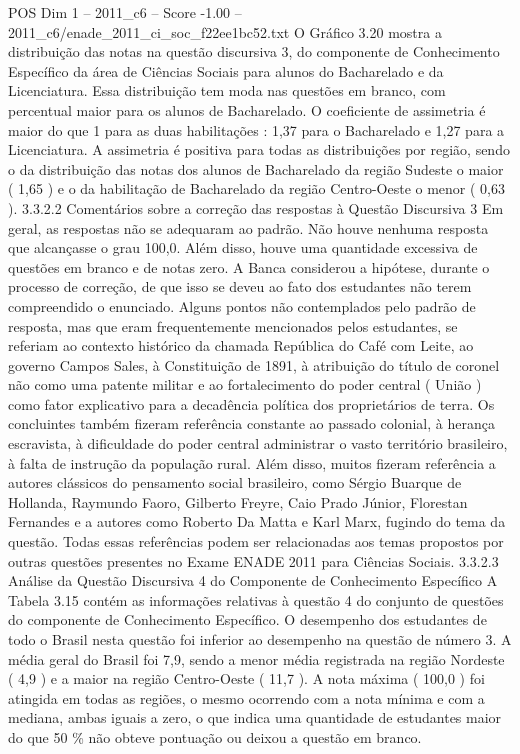 \begin{textsample}{POS Dim 1 – 2011\_c6 – Score -1.00 – 2011\_c6/enade\_2011\_ci\_soc\_f22ee1bc52.txt}
O Gráfico 3.20 mostra a distribuição das notas na questão discursiva 3, do componente de Conhecimento Específico da área de Ciências Sociais para alunos do Bacharelado e da Licenciatura.
Essa distribuição tem moda nas questões em branco, com percentual maior para os alunos de Bacharelado.
O coeficiente de assimetria é maior do que 1 para as duas habilitações : 1,37 para o Bacharelado e 1,27 para a Licenciatura.
A assimetria é positiva para todas as distribuições por região, sendo o da distribuição das notas dos alunos de Bacharelado da região Sudeste o maior ( 1,65 ) e o da habilitação de Bacharelado da região Centro-Oeste o menor ( 0,63 ). 3.3.2.2 Comentários sobre a correção das respostas à Questão Discursiva 3 Em geral, as respostas não se adequaram ao padrão.
Não houve nenhuma resposta que alcançasse o grau 100,0.
Além disso, houve uma quantidade excessiva de questões em branco e de notas zero.
A Banca considerou a hipótese, durante o processo de correção, de que isso se deveu ao fato dos estudantes não terem compreendido o enunciado.
Alguns pontos não contemplados pelo padrão de resposta, mas que eram frequentemente mencionados pelos estudantes, se referiam ao contexto histórico da chamada República do Café com Leite, ao governo Campos Sales, à Constituição de 1891, à atribuição do título de coronel não como uma patente militar e ao fortalecimento do poder central ( União ) como fator explicativo para a decadência política dos proprietários de terra.
Os concluintes também fizeram referência constante ao passado colonial, à herança escravista, à dificuldade do poder central administrar o vasto território brasileiro, à falta de instrução da população rural.
Além disso, muitos fizeram referência a autores clássicos do pensamento social brasileiro, como Sérgio Buarque de Hollanda, Raymundo Faoro, Gilberto Freyre, Caio Prado Júnior, Florestan Fernandes e a autores como Roberto Da Matta e Karl Marx, fugindo do tema da questão.
Todas essas referências podem ser relacionadas aos temas propostos por outras questões presentes no Exame ENADE 2011 para Ciências Sociais. 3.3.2.3 Análise da Questão Discursiva 4 do Componente de Conhecimento Específico A Tabela 3.15 contém as informações relativas à questão 4 do conjunto de questões do componente de Conhecimento Específico.
O desempenho dos estudantes de todo o Brasil nesta questão foi inferior ao desempenho na questão de número 3.
A média geral do Brasil foi 7,9, sendo a menor média registrada na região Nordeste ( 4,9 ) e a maior na região Centro-Oeste ( 11,7 ).
A nota máxima ( 100,0 ) foi atingida em todas as regiões, o mesmo ocorrendo com a nota mínima e com a mediana, ambas iguais a zero, o que indica uma quantidade de estudantes maior do que 50 \% não obteve pontuação ou deixou a questão em branco.

\end{textsample}
